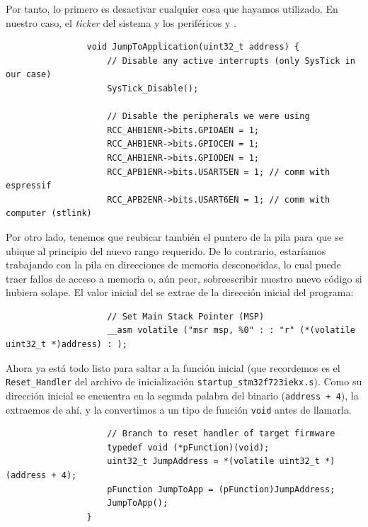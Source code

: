 \documentclass[../main.tex]{subfiles}
\begin{document}
            Por tanto, lo primero es desactivar cualquier cosa que hayamos utilizado. En nuestro caso, el \emph{ticker} del sistema y los periféricos  y . 

            \begin{lstlisting}
                void JumpToApplication(uint32_t address) {
                    // Disable any active interrupts (only SysTick in our case)
                    SysTick_Disable();

                    // Disable the peripherals we were using
                    RCC_AHB1ENR->bits.GPIOAEN = 1;
                    RCC_AHB1ENR->bits.GPIOCEN = 1;
                    RCC_AHB1ENR->bits.GPIODEN = 1;
                    RCC_APB1ENR->bits.USART5EN = 1;	// comm with espressif
                    RCC_APB2ENR->bits.USART6EN = 1; // comm with computer (stlink)
            \end{lstlisting}

            Por otro lado, tenemos que reubicar también el puntero de la pila para que se ubique al principio del nuevo rango requerido. De lo contrario, estaríamos trabajando con la pila en direcciones de memoria desconocidas, lo cual puede traer fallos de acceso a memoria o, aún peor, sobreescribir nuestro nuevo código si hubiera solape. El valor inicial del  se extrae de la dirección inicial del programa:

            \begin{lstlisting}
                    // Set Main Stack Pointer (MSP)
                    __asm volatile ("msr msp, %0" : : "r" (*(volatile uint32_t *)address) : );
            \end{lstlisting}

            Ahora ya está todo listo para saltar a la función inicial (que recordemos es el \texttt{Reset\_Handler} del archivo de inicialización \texttt{startup\_stm32f723iekx.s}). Como su dirección inicial se encuentra en la segunda palabra del binario (\texttt{address + 4}), la extraemos de ahí, y la convertimos a un tipo de función \texttt{void} antes de llamarla.

            \begin{lstlisting}
                    // Branch to reset handler of target firmware
                    typedef void (*pFunction)(void);
                    uint32_t JumpAddress = *(volatile uint32_t *)(address + 4);
                    pFunction JumpToApp = (pFunction)JumpAddress;
                    JumpToApp();
                }
            \end{lstlisting}
\end{document}
